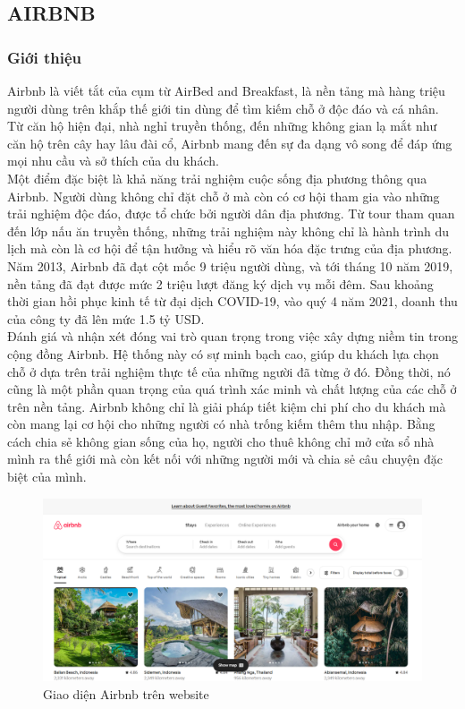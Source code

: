 \subsection{AIRBNB}
\subsubsection{Giới thiệu}
\hspace*{1cm}Airbnb là viết tắt của cụm từ AirBed and Breakfast, là nền tảng mà hàng triệu người dùng trên khắp thế giới tin dùng để tìm kiếm chỗ ở độc đáo và cá nhân. Từ căn hộ hiện đại, nhà nghỉ truyền thống, đến những không gian lạ mắt như căn hộ trên cây hay lâu đài cổ, Airbnb mang đến sự đa dạng vô song để đáp ứng mọi nhu cầu và sở thích của du khách. \cite{airbnb}\\
\hspace*{1cm}Một điểm đặc biệt là khả năng trải nghiệm cuộc sống địa phương thông qua Airbnb. Người dùng không chỉ đặt chỗ ở mà còn có cơ hội tham gia vào những trải nghiệm độc đáo, được tổ chức bởi người dân địa phương. Từ tour tham quan đến lớp nấu ăn truyền thống, những trải nghiệm này không chỉ là hành trình du lịch mà còn là cơ hội để tận hưởng và hiểu rõ văn hóa đặc trưng của địa phương. Năm 2013, Airbnb đã đạt cột mốc 9 triệu người dùng, và tới tháng 10 năm 2019, nền tảng đã đạt được mức 2 triệu lượt đăng ký dịch vụ mỗi đêm. Sau khoảng thời gian hồi phục kinh tế từ đại dịch COVID-19, vào quý 4 năm 2021, doanh thu của công ty đã lên mức 1.5 tỷ USD. \cite{airbnbstat}\\
\hspace*{1cm}Đánh giá và nhận xét đóng vai trò quan trọng trong việc xây dựng niềm tin trong cộng đồng Airbnb. Hệ thống này có sự minh bạch cao, giúp du khách lựa chọn chỗ ở dựa trên trải nghiệm thực tế của những người đã từng ở đó. Đồng thời, nó cũng là một phần quan trọng của quá trình xác minh và chất lượng của các chỗ ở trên nền tảng. Airbnb không chỉ là giải pháp tiết kiệm chi phí cho du khách mà còn mang lại cơ hội cho những người có nhà trống kiếm thêm thu nhập. Bằng cách chia sẻ không gian sống của họ, người cho thuê không chỉ mở cửa sổ nhà mình ra thế giới mà còn kết nối với những người mới và chia sẻ câu chuyện đặc biệt của mình.
\begin{figure}[H]
    \centering
    \includegraphics[width=1\textwidth]{Images/RelatedSystems/AirbnbDesktop.png}
    \caption{Giao diện Airbnb trên website}
\end{figure}
